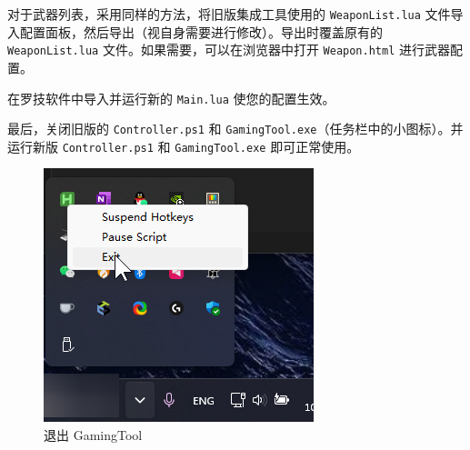 对于武器列表，采用同样的方法，将旧版集成工具使用的 \lstinline{WeaponList.lua} 文件导入配置面板，然后导出（视自身需要进行修改）。导出时覆盖原有的 \lstinline{WeaponList.lua} 文件。如果需要，可以在浏览器中打开 \lstinline{Weapon.html} 进行武器配置。

在罗技软件中导入并运行新的 \lstinline{Main.lua} 使您的配置生效。

最后，关闭旧版的 \lstinline{Controller.ps1} 和 \lstinline{GamingTool.exe}（任务栏中的小图标）。并运行新版 \lstinline{Controller.ps1} 和 \lstinline{GamingTool.exe} 即可正常使用。

\begin{figure}[H]
    \Centering
    \includegraphics[width=\textwidth]{docs/assets/intro/exit_gamingtool}
    \caption{退出 GamingTool}
\end{figure}